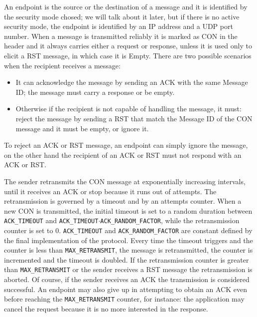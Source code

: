 	An endpoint is the source or the destination of a message and it is identified by the security mode chosed; we will talk about it later, but if there is no active security mode, the endpoint is identified by an IP address and a UDP port number.\newline
	When a message is transmitted reliably it is marked as CON in the header and it always carries either a request or response, unless it is used only to elicit a RST message, in which case it is Empty.\newline
	There are two possible scenarios when the recipient receives a message:\newline
		\begin{itemize}
		\item It can acknowledge the message by sending an ACK with the same Message ID; the message must carry a response or be empty.
		\item Otherwise if the recipient is not capable of handling the message, it must: reject the message by sending a RST that match the Message ID of the CON message and it must be empty, or ignore it.
	\end{itemize}

	To reject an ACK or RST message, an endpoint can simply ignore the message, on the other hand
	the recipient of an ACK or RST must not respond with an ACK or RST.\newline
	
	The sender retransmits the CON message at exponentially increasing intervals, 
	until it receives an ACK or stop because it runs out of attempts.\newline
	The retransmission is governed by a timeout and by an attempts counter.\newline
	When a new CON is transmitted, the initial timeout is set to a random duration between
	\texttt{ACK\_TIMEOUT} 
	and \texttt{ACK\_TIMEOUT$\cdot$ACK\_RANDOM\_FACTOR}, while the retransmission counter is set to 0.\newline
	\texttt{ACK\_TIMEOUT} and \texttt{ACK\_RANDOM\_FACTOR} are constant defined by the final implementation of the protocol.\newline
	Every time the timeout triggers and the counter is less than \texttt{MAX\_RETRANSMIT}, the message is retransmitted, the counter is incremented and the timeout is doubled.\newline
	If the retransmission counter is greater than \texttt{MAX\_RETRANSMIT} or the sender receives a RST message the retransmission is aborted.\newline
	Of course, if the sender receives an ACK the transmission is considered successful.\newline
	An endpoint may also give up in attempting to obtain an ACK even before reaching the \texttt{MAX\_RETRANSMIT} counter, for instance: the application may cancel the request because it is no more interested in the response.\newline
	
